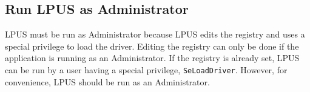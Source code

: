 \subsection[Run LPUS as Administrator]{Run LPUS as Administrator}

LPUS must be run as Administrator because LPUS edits the registry and uses a
special privilege to load the driver. Editing the registry can only be done if
the application is running as an Administrator. If the registry is already set,
LPUS can be run by a user having a special privilege, \texttt{SeLoadDriver}.
However, for convenience, LPUS should be run as an Administrator.

